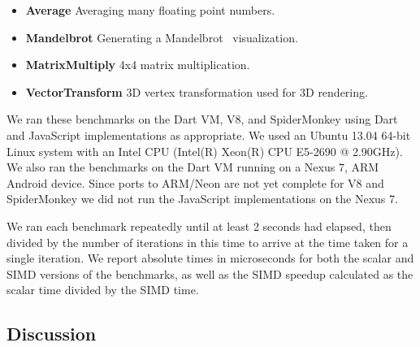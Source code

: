 \documentclass[preprint]{sigplanconf}
\begin{document}
\begin{itemize}
\begin{itemize}
\item \textbf{Sinex4} Compute 4 sine values at once.
\end{itemize}

\subsection{Results}

In this section we discuss  present benchmark results for four different benchmarks.
%
Full source code of these benchmarks is available from a GitHub
repository\footnote{\href{https://github.com/johnmccut
chan/ecmascript_simd/}{ECMAScript SIMD Polyfill}}.

\item
\textbf{Average} Averaging many floating point numbers.

\item
\textbf{Mandelbrot} Generating a Mandelbrot~\cite{mandelbrot} visualization.

\item
\textbf{MatrixMultiply} 4x4 matrix multiplication.

\item
\textbf{VectorTransform} 3D vertex transformation used for 3D rendering.
\end{itemize}


We ran these benchmarks on the Dart VM, V8, and SpiderMonkey using Dart and
JavaScript implementations as appropriate.
%
We used an Ubuntu 13.04 64-bit Linux system with an Intel CPU
(Intel(R) Xeon(R) CPU E5-2690 @ 2.90GHz).
%
We also ran the benchmarks on the Dart VM running on a Nexus 7, ARM Android
device.
%
Since ports to ARM/Neon are not yet complete for V8 and SpiderMonkey we did not
run the JavaScript implementations on the Nexus 7.


We ran each benchmark repeatedly until at least 2 seconds had elapsed, then
divided by the number of iterations in this time to arrive at the time taken
for a single iteration.
%
We report absolute times in microseconds for both the scalar and SIMD versions
of the benchmarks, as well as the SIMD speedup calculated as the scalar time
divided by the SIMD time.


\subsection{Discussion}
\end{document}
